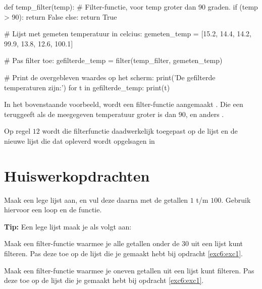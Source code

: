 \begin{python}
def temp_filter(temp):
    # Filter-functie, voor temp groter dan 90 graden.
    if (temp > 90):
        return False
    else:
        return True

# Lijst met gemeten temperatuur in celcius:  
gemeten_temp = [15.2, 14.4, 14.2, 99.9, 13.8, 12.6, 100.1]

# Pas filter toe:
gefilterde_temp = filter(temp_filter, gemeten_temp)

# Print de overgebleven waardes op het scherm:
print('De gefilterde temperaturen zijn:')
for t in gefilterde_temp:
    print(t)                    
\end{python}

In het bovenstaande voorbeeld, wordt een filter-functie aangemaakt . Die een  teruggeeft als de meegegeven temperatuur  groter is dan $90$, en anders . 

Op regel $12$ wordt die filterfunctie daadwerkelijk toegepast op de lijst  en de nieuwe lijst die dat opleverd wordt opgelsagen in 

\newpage

\section{Huiswerkopdrachten}
\vspace{5mm} 

\begin{exercise}\label{exc6:exc1}
Maak een lege lijst aan, en vul deze daarna met de getallen $1$ t/m $100$.
Gebruik hiervoor een loop en de  functie. 

\textbf{Tip:} Een lege lijst maak je als volgt aan: 
\end{exercise}

\begin{exercise}
Maak een filter-functie waarmee je alle getallen onder de $30$ uit een lijst kunt filteren. Pas deze toe op de lijst die je gemaakt hebt bij opdracht \ref{exc6:exc1}.
\end{exercise}

\begin{exercise}
Maak een filter-functie waarmee je oneven getallen uit een lijst kunt filteren. Pas deze toe op de lijst die je gemaakt hebt bij opdracht \ref{exc6:exc1}.
\end{exercise}

